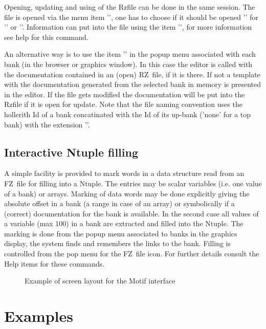 Opening, updating and using of the Rzfile can be done in the
same session. The file is opened via the menu item
'', one has to choose if it should be
opened '' for '' or ''.
Information can put into the file using the item
'', for more information see help for this
command.
 
An alternative way is to use the item '' in
the popup menu associated with each bank (in the browser or
graphics window). 
In this case the editor is called with the
documentation contained in an (open) RZ~file, if it is there.
If not a template with the documentation generated from the
selected bank in memory is presented in the editor.
If the file gets modified the documentation will be put into
the Rzfile if it is open for update. Note that the file
naming convention uses the hollerith Id of a bank
concatinated with the Id of its up-bank ('none' for a top
bank) with the extension ''.
 
\subsection{Interactive Ntuple filling}
 
A simple facility is provided to mark words in a data structure
read from an FZ~file for filling into a Ntuple. The entries may
be scalar variables (i.e. one value of a bank) or arrays. 
Marking of data words may be done explicitly giving the absolute
offset in a bank (a range in case of an array) or symbolically
if a (correct) documentation for the bank is available. In the
second case all values of a variable (max 100) in a bank are 
extracted and filled into the Ntuple. 
The marking is done from the popup menu associated to banks in
the graphics display, the system finds and remembers the links
to the bank.
Filling is controlled from the pop menu for the FZ~file icon.
For further details consult the Help items for these commands.
 
\begin{figure}[p]
  \begin{center}
     \mbox{}
    \caption{Example of screen layout for the Motif interface}
    \label{fig:DZDOCFIG6}
  \end{center}
\end{figure}

\clearpage
 
\section{Examples}
\label{sec:dzdocexamples} 
 
